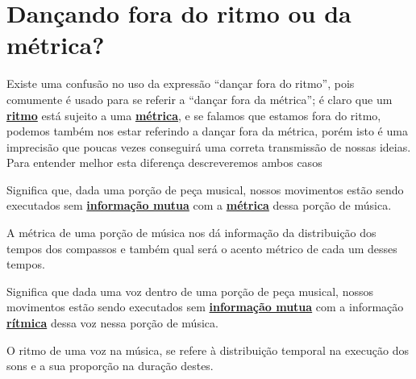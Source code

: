 
\newpage
\section{Dançando fora do ritmo ou da métrica?}

Existe uma confusão no uso da expressão ``dançar fora do ritmo'',
pois comumente é usado para se referir a ``dançar fora da métrica'';
é claro que um \hyperref[sec:pos:Ritmo]{\textbf{ritmo}} está sujeito a uma \hyperref[def:Metrica]{\textbf{métrica}}, 
e se falamos que estamos fora do ritmo,
podemos também nos estar referindo a  dançar fora da métrica, 
porém isto é uma imprecisão que poucas vezes conseguirá
uma correta transmissão de nossas ideias.
Para entender melhor esta diferença descreveremos ambos casos


\begin{definition}
Significa que, dada uma porção de peça musical,
nossos movimentos estão sendo executados sem 
\hyperref[sec:musicalidadeinfmutua]{\textbf{informação mutua}} com a \hyperref[def:Metrica]{\textbf{métrica}}
dessa porção de música.

A métrica de uma porção de música nos dá informação da distribuição
dos tempos dos compassos e também qual será o acento métrico de cada um desses tempos.
\end{definition}

\begin{definition}
\label{def:fora-do-ritmo}
Significa que dada uma voz dentro de uma porção de peça musical,
nossos movimentos estão sendo executados sem 
\hyperref[sec:musicalidadeinfmutua]{\textbf{informação mutua}} com a 
informação \hyperref[sec:pos:Ritmo]{\textbf{rítmica}} dessa voz nessa porção de música.

O ritmo de uma voz na música, 
se refere à distribuição temporal na execução dos sons e a sua proporção na duração
destes.
\end{definition}

